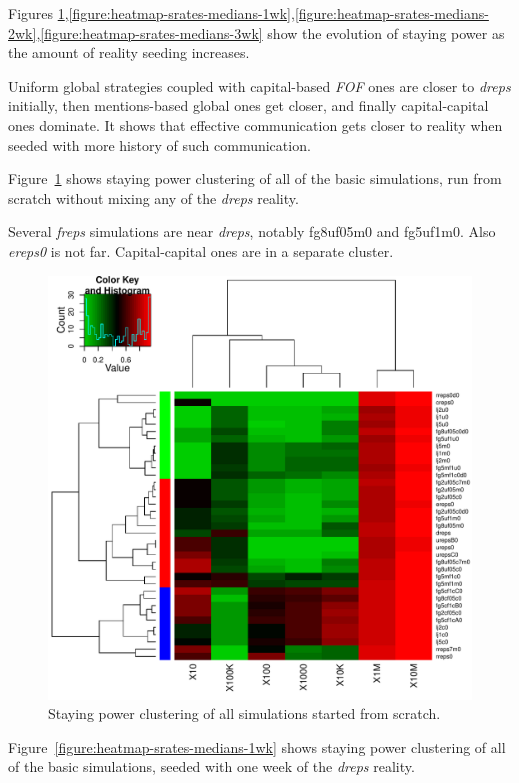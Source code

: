 \documentclass[10pt,oneside]{memoir}
\begin{document}
Figures \ref{figure:heatmap-srates-medians-0wk},\ref{figure:heatmap-srates-medians-1wk},\ref{figure:heatmap-srates-medians-2wk},\ref{figure:heatmap-srates-medians-3wk} show the evolution of staying power as the amount of reality seeding increases.  


Uniform global strategies coupled with capital-based {\itshape FOF} ones are closer to {\itshape dreps} initially, then mentions-based global ones get closer, and finally capital-capital ones dominate.  It shows that effective communication gets closer to reality when seeded with more history of such communication.


Figure~\ref{figure:heatmap-srates-medians-0wk} shows staying power clustering of all of the basic simulations, run from scratch without mixing any of the {\itshape dreps} reality.


Several {\itshape freps} simulations are near {\itshape dreps}, notably fg8uf05m0 and fg5uf1m0.  Also {\itshape ereps0} is not far.  Capital-capital ones are in a separate cluster.



\begin{figure}
\begin{center}
    \includegraphics{figures/heatmap-srates-medians-0wk}
    \caption{Staying power clustering of all simulations started from scratch.}
    \label{figure:heatmap-srates-medians-0wk}
\end{center}
\end{figure}
Figure~\ref{figure:heatmap-srates-medians-1wk} shows staying power clustering of all of the basic simulations, seeded with one week of the {\itshape dreps} reality.
\end{document}
